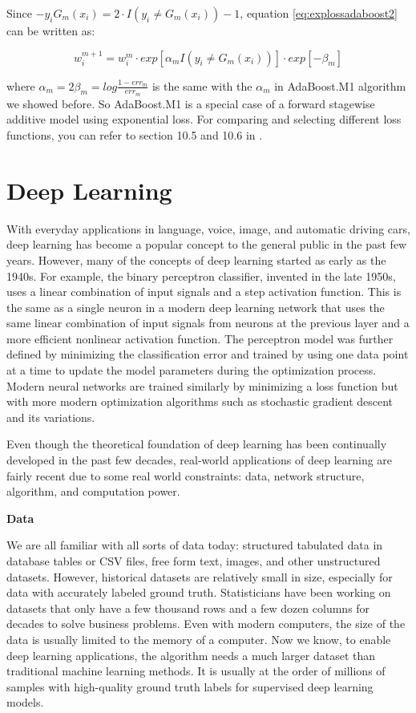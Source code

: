 \documentclass[
  12pt,
]{krantz}
\begin{document}
Since \(-y_i G_m(x_i)=2\cdot I(y_i \neq G_m(x_i))-1\), equation \eqref{eq:explossadaboost2} can be written as:

\[w_i^{m+1}=w_i^m \cdot exp[\alpha_mI(y_i\neq G_m(x_i))] \cdot exp[-\beta_m]\]

where \(\alpha_m=2\beta_m=log\frac{1-err_m}{err_m}\) is the same with the \(\alpha_m\) in AdaBoost.M1 algorithm we showed before. So AdaBoost.M1 is a special case of a forward stagewise additive model using exponential loss. For comparing and selecting different loss functions, you can refer to section 10.5 and 10.6 in \citep{Hastie2008}.

\hypertarget{deeplearning}{%
\chapter{Deep Learning}\label{deeplearning}}

With everyday applications in language, voice, image, and automatic driving cars, deep learning has become a popular concept to the general public in the past few years. However, many of the concepts of deep learning started as early as the 1940s. For example, the binary perceptron classifier, invented in the late 1950s, uses a linear combination of input signals and a step activation function. This is the same as a single neuron in a modern deep learning network that uses the same linear combination of input signals from neurons at the previous layer and a more efficient nonlinear activation function. The perceptron model was further defined by minimizing the classification error and trained by using one data point at a time to update the model parameters during the optimization process. Modern neural networks are trained similarly by minimizing a loss function but with more modern optimization algorithms such as stochastic gradient descent and its variations.

Even though the theoretical foundation of deep learning has been continually developed in the past few decades, real-world applications of deep learning are fairly recent due to some real world constraints: data, network structure, algorithm, and computation power.

\textbf{Data}

We are all familiar with all sorts of data today: structured tabulated data in database tables or CSV files, free form text, images, and other unstructured datasets. However, historical datasets are relatively small in size, especially for data with accurately labeled ground truth. Statisticians have been working on datasets that only have a few thousand rows and a few dozen columns for decades to solve business problems. Even with modern computers, the size of the data is usually limited to the memory of a computer. Now we know, to enable deep learning applications, the algorithm needs a much larger dataset than traditional machine learning methods. It is usually at the order of millions of samples with high-quality ground truth labels for supervised deep learning models.
\end{document}
